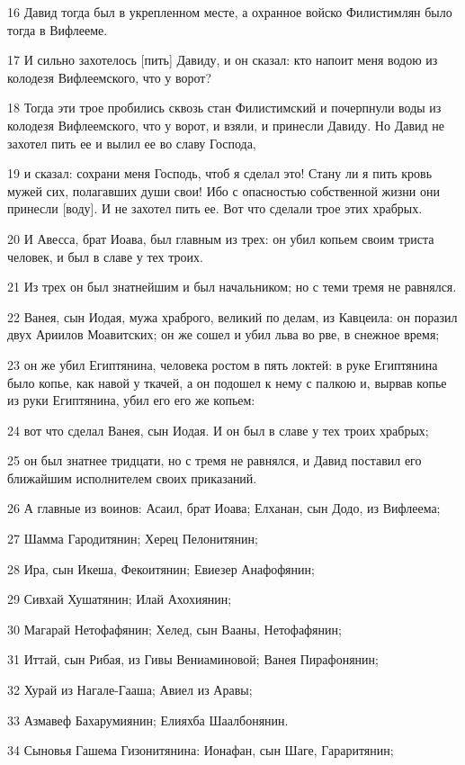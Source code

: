 \par 16 Давид тогда был в укрепленном месте, а охранное войско Филистимлян было тогда в Вифлееме.
\par 17 И сильно захотелось [пить] Давиду, и он сказал: кто напоит меня водою из колодезя Вифлеемского, что у ворот?
\par 18 Тогда эти трое пробились сквозь стан Филистимский и почерпнули воды из колодезя Вифлеемского, что у ворот, и взяли, и принесли Давиду. Но Давид не захотел пить ее и вылил ее во славу Господа,
\par 19 и сказал: сохрани меня Господь, чтоб я сделал это! Стану ли я пить кровь мужей сих, полагавших души свои! Ибо с опасностью собственной жизни они принесли [воду]. И не захотел пить ее. Вот что сделали трое этих храбрых.
\par 20 И Авесса, брат Иоава, был главным из трех: он убил копьем своим триста человек, и был в славе у тех троих.
\par 21 Из трех он был знатнейшим и был начальником; но с теми тремя не равнялся.
\par 22 Ванея, сын Иодая, мужа храброго, великий по делам, из Кавцеила: он поразил двух Ариилов Моавитских; он же сошел и убил льва во рве, в снежное время;
\par 23 он же убил Египтянина, человека ростом в пять локтей: в руке Египтянина было копье, как навой у ткачей, а он подошел к нему с палкою и, вырвав копье из руки Египтянина, убил его его же копьем:
\par 24 вот что сделал Ванея, сын Иодая. И он был в славе у тех троих храбрых;
\par 25 он был знатнее тридцати, но с тремя не равнялся, и Давид поставил его ближайшим исполнителем своих приказаний.
\par 26 А главные из воинов: Асаил, брат Иоава; Елханан, сын Додо, из Вифлеема;
\par 27 Шамма Гародитянин; Херец Пелонитянин;
\par 28 Ира, сын Икеша, Фекоитянин; Евиезер Анафофянин;
\par 29 Сивхай Хушатянин; Илай Ахохиянин;
\par 30 Магарай Нетофафянин; Хелед, сын Вааны, Нетофафянин;
\par 31 Иттай, сын Рибая, из Гивы Вениаминовой; Ванея Пирафонянин;
\par 32 Хурай из Нагале-Гааша; Авиел из Аравы;
\par 33 Азмавеф Бахарумиянин; Елияхба Шаалбонянин.
\par 34 Сыновья Гашема Гизонитянина: Ионафан, сын Шаге, Гараритянин;
